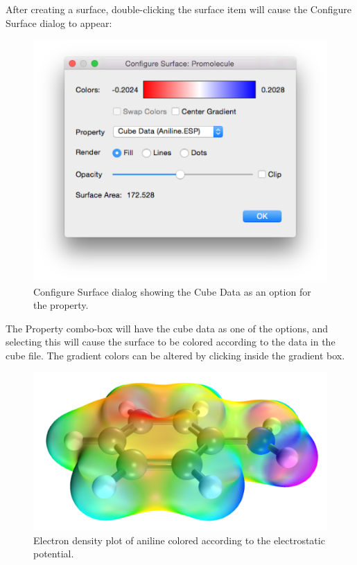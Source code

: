 \documentclass[a4paper,12pt]{article}
\begin{document}
After creating a surface, double-clicking the surface item will
cause the Configure Surface dialog to appear:
\begin{figure}[h]
\begin{center}
\includegraphics[scale=0.15]{figures/SurfaceConfigurator.png}
\caption{Configure Surface dialog showing the Cube Data as an option for the property.}
\label{fig:surfaceconfig}
\end{center}
\end{figure}

The Property combo-box will have the cube data as one of the options, and selecting
this will cause the surface to be colored according to the data in the cube file.
The gradient colors can be altered by clicking inside the gradient box.
\begin{figure}[h]
\begin{center}
\includegraphics[scale=0.30]{figures/ESP.png}
\end{center}
\caption{Electron density plot of aniline colored according to the electrostatic potential.}
\end{figure}
\end{document}
